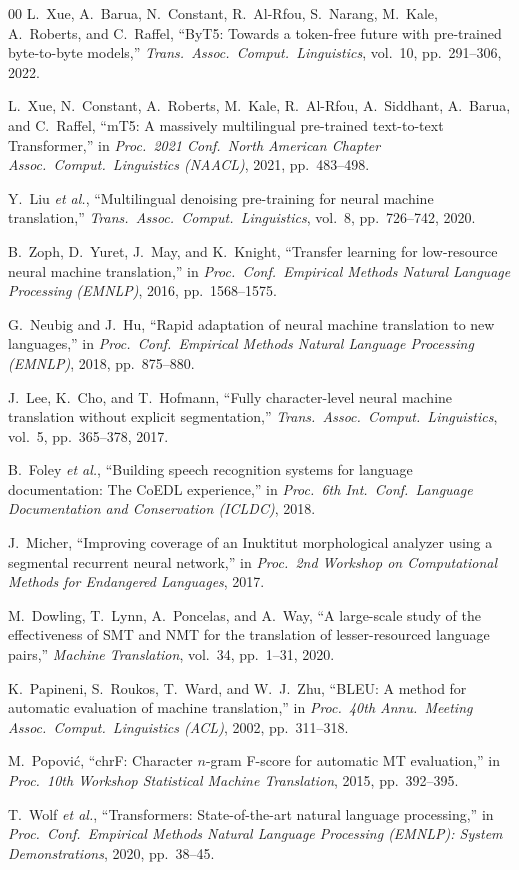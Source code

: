 \documentclass[conference]{IEEEtran}
\begin{document}
\begin{thebibliography}{00}
L.~Xue, A.~Barua, N.~Constant, R.~Al-Rfou, S.~Narang, M.~Kale, A.~Roberts, and C.~Raffel, ``ByT5: Towards a token-free future with pre-trained byte-to-byte models,'' \textit{Trans.\ Assoc.\ Comput.\ Linguistics}, vol.~10, pp.~291--306, 2022.

L.~Xue, N.~Constant, A.~Roberts, M.~Kale, R.~Al-Rfou, A.~Siddhant, A.~Barua, and C.~Raffel, ``mT5: A massively multilingual pre-trained text-to-text Transformer,'' in \textit{Proc.\ 2021 Conf.\ North American Chapter Assoc.\ Comput.\ Linguistics (NAACL)}, 2021, pp.~483--498.

Y.~Liu \textit{et al.}, ``Multilingual denoising pre-training for neural machine translation,'' \textit{Trans.\ Assoc.\ Comput.\ Linguistics}, vol.~8, pp.~726--742, 2020.

B.~Zoph, D.~Yuret, J.~May, and K.~Knight, ``Transfer learning for low-resource neural machine translation,'' in \textit{Proc.\ Conf.\ Empirical Methods Natural Language Processing (EMNLP)}, 2016, pp.~1568--1575.

G.~Neubig and J.~Hu, ``Rapid adaptation of neural machine translation to new languages,'' in \textit{Proc.\ Conf.\ Empirical Methods Natural Language Processing (EMNLP)}, 2018, pp.~875--880.

J.~Lee, K.~Cho, and T.~Hofmann, ``Fully character-level neural machine translation without explicit segmentation,'' \textit{Trans.\ Assoc.\ Comput.\ Linguistics}, vol.~5, pp.~365--378, 2017.

B.~Foley \textit{et al.}, ``Building speech recognition systems for language documentation: The CoEDL experience,'' in \textit{Proc.\ 6th Int.\ Conf.\ Language Documentation and Conservation (ICLDC)}, 2018.

J.~Micher, ``Improving coverage of an Inuktitut morphological analyzer using a segmental recurrent neural network,'' in \textit{Proc.\ 2nd Workshop on Computational Methods for Endangered Languages}, 2017.

M.~Dowling, T.~Lynn, A.~Poncelas, and A.~Way, ``A large-scale study of the effectiveness of SMT and NMT for the translation of lesser-resourced language pairs,'' \textit{Machine Translation}, vol.~34, pp.~1--31, 2020.

K.~Papineni, S.~Roukos, T.~Ward, and W.~J.~Zhu, ``BLEU: A method for automatic evaluation of machine translation,'' in \textit{Proc.\ 40th Annu.\ Meeting Assoc.\ Comput.\ Linguistics (ACL)}, 2002, pp.~311--318.

M.~Popovi\'{c}, ``chrF: Character $n$-gram F-score for automatic MT evaluation,'' in \textit{Proc.\ 10th Workshop Statistical Machine Translation}, 2015, pp.~392--395.

T.~Wolf \textit{et al.}, ``Transformers: State-of-the-art natural language processing,'' in \textit{Proc.\ Conf.\ Empirical Methods Natural Language Processing (EMNLP): System Demonstrations}, 2020, pp.~38--45.

\end{thebibliography}
\end{document}
